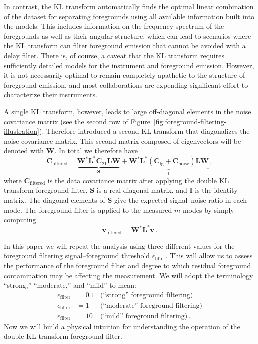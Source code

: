 \documentclass[twocolumn]{aastex62}
\renewcommand{\b}{\pmb}
\begin{document}
In contrast, the KL transform automatically finds the optimal linear combination of the dataset for
separating foregrounds using all available information built into the models. This includes
information on the frequency spectrum of the foregrounds as well as their angular structure, which
can lead to scenarios where the KL transform can filter foreground emission that cannot be avoided
with a delay filter. There is, of course, a caveat that the KL transform requires sufficiently
detailed models for the instrument and foreground emission. However, it is not necessarily optimal
to remain completely apathetic to the structure of foreground emission, and most collaborations are
expending significant effort to characterize their instruments.

A single KL transform, however, leads to large off-diagonal elements in the noise covariance matrix
(see the second row of Figure~\ref{fig:foreground-filtering-illustration}). Therefore
\citet{2014ApJ...781...57S,2015PhRvD..91h3514S} introduced a second KL transform that diagonalizes
the noise covariance matrix. This second matrix composed of eigenvectors will be denoted with $\b
W$. In total we therefore have
\begin{equation}
    \b C_\text{filtered}
        = \underbrace{\b W^*\b L^*\b C_\text{21}\b L\b W}_{\b S}
        + \underbrace{\b W^*\b L^*(\b C_\text{fg} + \b C_\text{noise})\b L\b W}_{\b I}\,,
\end{equation}
where $\b C_\text{filtered}$ is the data covariance matrix after applying the double KL transform
foreground filter, $\b S$ is a real diagonal matrix, and $\b I$ is the identity matrix. The diagonal
elements of $\b S$ give the expected signal--noise ratio in each mode.  The foreground filter is
applied to the measured $m$-modes by simply computing
\begin{equation}
    \b v_\text{filtered} = \b W^*\b L^*\b v\,.
\end{equation}

In this paper we will repeat the analysis using three different values for the foreground filtering
signal--foreground threshold $\epsilon_\text{filter}$. This will allow us to assess the performance
of the foreground filter and degree to which residual foreground contamination may be affecting the
measurement. We will adopt the terminology ``strong,'' ``moderate,'' and ``mild'' to mean:
\begin{align*}
    \epsilon_\text{filter} &= 0.1 & \text{(``strong'' foreground filtering)} \\
    \epsilon_\text{filter} &= 1   & \text{(``moderate'' foreground filtering)} \\
    \epsilon_\text{filter} &= 10  & \text{(``mild'' foreground filtering)}\,.
\end{align*}
Now we will build a physical intuition for understanding the operation of the double KL transform
foreground filter.
\end{document}
